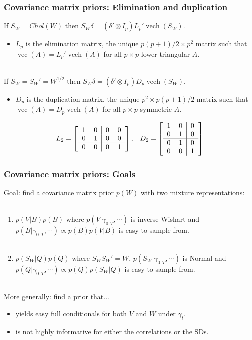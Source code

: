 \documentclass[xcolor=dvipsnames]{beamer}
\DeclareMathOperator{\vech}{vech}
\DeclareMathOperator{\vect}{vec}
\begin{document}
\begin{frame}
\frametitle{Covariance matrix priors: Elimination and duplication}

 If $S_W=Chol(W)$ then $S_W\delta = (\delta' \otimes I_p)L_p'\vech(S_W)$.
\begin{itemize}
\item $L_p$ is the elimination matrix, the unique $p(p+1)/2\times p^2$ matrix such that $\vect(A)=L_p'\vech(A)$ for all $p\times p$ lower triangular $A$.\\~\\
\end{itemize}
\pause If $S_W=S_W'=W^{1/2}$ then $S_W\delta = (\delta' \otimes I_p)D_p\vech(S_W)$.
\begin{itemize}
\item $D_p$ is the duplication matrix, the unique $p^2\times p(p+1)/2$ matrix such that $\vect(A)=D_p\vech(A)$ for all $p\times p$ symmetric $A$.
\end{itemize}

\pause\begin{align*}
L_2 = \left[\begin{tabular}{cc|cc} 1 & 0 & 0 & 0 \\ 0 & 1 & 0 & 0 \\\hline 0 & 0 & 0 & 1 \end{tabular}\right], && D_2 = \left[\begin{tabular}{cc|c} 1 & 0 & 0 \\ 0 & 1 &  0 \\\hline 0 & 1 & 0\\ 0 & 0 & 1 \end{tabular}\right]
\end{align*}

\end{frame}

\begin{frame}
\frametitle{Covariance matrix priors: Goals}
Goal: find a covariance matrix prior $p(W)$ with two mixture representations:\\~
\begin{enumerate}
\item $p(V|B)p(B)$ where $p(V|\gamma_{0:T},\cdots)$ is inverse Wishart and $p(B|\gamma_{0:T},\cdots)\propto p(B)p(V|B)$ is easy to sample from.\\~
\item $p(S_W|Q)p(Q)$ where $S_WS_W'=W$, $p(S_W|\gamma_{0:T},\cdots)$ is Normal and $p(Q|\gamma_{0:T},\cdots)\propto p(Q)p(S_W|Q)$ is easy to sample from.\\~
\end{enumerate}
\pause More generally: find a prior that...
\begin{itemize}
\item yields easy full conditionals for both $V$ and $W$ under $\gamma_t$.
\item is not highly informative for either the correlations or the SDs.\\~
\end{itemize}

\end{frame}
\end{document}
